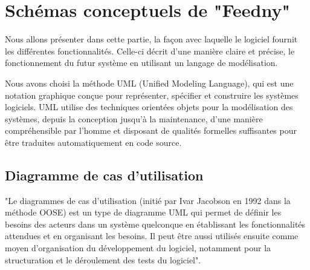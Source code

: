 
\section{Schémas conceptuels de "Feedny"}
Nous allons présenter dans cette partie, la façon avec laquelle le logiciel fournit les différentes fonctionnalités. Celle-ci décrit d'une manière claire et précise, le fonctionnement du futur système en utilisant un langage de modélisation. 

Nous avons choisi la méthode UML (Unified Modeling Language), qui est une notation graphique conçue pour représenter, spécifier et construire les systèmes logiciels. UML utilise des techniques orientées objets pour la modélisation des systèmes, depuis la conception jusqu'à la maintenance, d'une manière compréhensible par l'homme et disposant de qualités formelles suffisantes pour être traduites automatiquement en code source.\cite{UML}

\subsection{Diagramme de cas d'utilisation}
"Le diagrammes de cas d'utilisation (initié par Ivar Jacobson en 1992 dans la méthode OOSE) est un type de diagramme UML qui permet de définir les besoins des acteurs dans un système quelconque en établissant les fonctionnalités attendues et en organisant les besoins. Il peut être aussi utilisés ensuite comme moyen d'organisation du développement du logiciel, notamment pour la structuration et le déroulement des tests du logiciel".\cite{UML}

